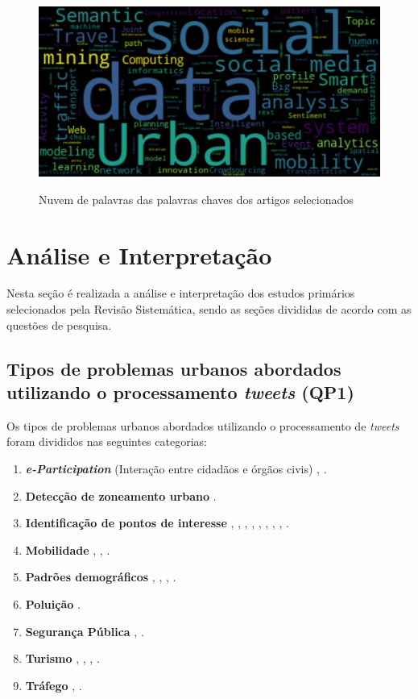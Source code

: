 \documentclass[
	12pt,				%
	oneside,			%
	a4paper,			%
	english,			%
	brazil				%
	]{abntex2ppgsi}
\begin{document}
{{\begin{figure}[H]%
	\centering
 	  \caption{Nuvem de palavras das palavras chaves dos artigos selecionados}
		\includegraphics[width=0.8\linewidth]{images/world_cloud_metodologia.png}
	\label{fig:w_cloud}
\end{figure}

\section{Análise e Interpretação}
\label{analise}
Nesta seção é realizada a análise e interpretação dos estudos primários selecionados pela Revisão Sistemática, sendo as seções divididas de acordo com as questões de pesquisa.
\subsection{Tipos de problemas urbanos abordados utilizando o processamento \textit{tweets} (QP1)}

Os tipos de problemas urbanos abordados utilizando o processamento de \textit{tweets} foram divididos nas seguintes categorias: 

\begin{enumerate}
\item \textit{\textbf{e-Participation}} (Interação entre  cidadãos  e órgãos civis) \cite{Mukherjee2015}, \cite{Soomro2016}.
\item \textbf{Detecção de zoneamento urbano} \cite{Frias-Martinez2014}.
\item \textbf{Identificação de pontos de interesse} \cite{Farseev2015}, \cite{Gutev2016}, \cite{Bendler2014}, \cite{Abbasi2015}, \cite{Gkiotsalitis2015}, \cite{Gkiotsalitis2016}, \cite{Hasan2014}, \cite{Maghrebi2015}, \cite{DiLorenzo2013}.
\item \textbf{Mobilidade} \cite{Gutev2016}, \cite{Chen2016}, \cite{Yousaf2014}.
\item \textbf{Padrões demográficos} \cite{Farseev2015}, \cite{Gutev2016}, \cite{Steiger2015Census}, \cite{Guo2016}.
\item \textbf{Poluição} \cite{Zagal2016}.
\item \textbf{Segurança Pública} \cite{Wen2016}, \cite{Mata2015}.
\item \textbf{Turismo} \cite{Thomaz2016}, \cite{Abbasi2015}, \cite{Chua2016}, \cite{Sobolevsky2015}.
\item \textbf{Tráfego} \cite{Anantharam2015}, \cite{Lecue2014}.
\end{enumerate}

}}
\end{document}
